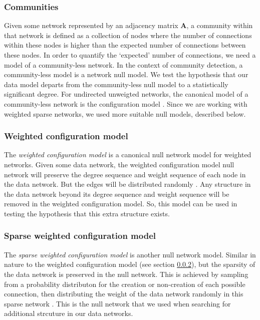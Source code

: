 \documentclass[a4paper,12pt]{article}
\theoremstyle{definition}
\begin{document}
        \subsubsection{Communities}
        Given some network represented by an adjacency matrix $\mathbf{A}$, a community within that network is defined as a collection of nodes where the number of connections within these nodes is higher than the expected number of connections between these nodes. In order to quantify the `expected' number of connections, we need a model of a community-less network. In the context of community detection, a community-less model is a network null model. We test the hypothesis that our data model departs from the community-less null model to a statistically significant degree. For undirected unweigted networks, the canonical model of a community-less network is the configuration model \cite{fosdick}. Since we are working with weighted sparse networks, we used more suitable null models, described below.

        \subsubsection{Weighted configuration model}\label{sec:weight_configuration_model}
        The \textit{weighted configuration model} is a canonical null network model for weighted networks. Given some data network, the weighted configuration model null network will preserve the degree sequence and weight sequence of each node in the data network. But the edges will be distributed randomly \cite{fosdick}. Any structure in the data network beyond its degree sequence and weight sequence will be removed in the weighted configuration model. So, this model can be used in testing the hypothesis that this extra structure exists. 

        \subsubsection{Sparse weighted configuration model}\label{sec:sparse_weighted_configuration_model}
        The \textit{sparse weighted configuration model} is another null network model. Similar in nature to the weighted configuration model (see section \ref{sec:weight_configuration_model}), but the sparsity of the data network is preserved in the null network. This is achieved by sampling from a probability distributon for the creation or non-creation of each possible connection, then distributing the weight of the data network randomly in this sparse network \cite{humphries}. This is the null network that we used when searching for additional strcuture in our data networks.
\end{document}
